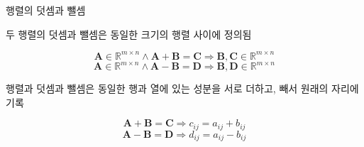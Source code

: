 \documentclass{beamer}
\begin{document}
\begin{frame}{행렬의 덧셈과 뺄셈}

두 행렬의 덧셈과 뺄셈은 동일한 크기의 행렬 사이에 정의됨

$$\mathbf A \in \mathbb R^{m \times n}  \wedge \mathbf A + \mathbf B = \mathbf C \Rightarrow \mathbf B, \mathbf C \in \mathbb R^{m \times n}$$
$$\mathbf A \in \mathbb R^{m \times n}  \wedge \mathbf A - \mathbf B = \mathbf D \Rightarrow \mathbf B, \mathbf D \in \mathbb R^{m \times n}$$

행렬과 덧셈과 뺄셈은 동일한 행과 열에 있는 성분을 서로 더하고, 빼서 원래의 자리에 기록

$$\mathbf A + \mathbf B = \mathbf C \Rightarrow c_{ij} = a_{ij} + b_{ij}$$
$$\mathbf A - \mathbf B = \mathbf D \Rightarrow d_{ij} = a_{ij} - b_{ij}$$

\end{frame}
\end{document}
